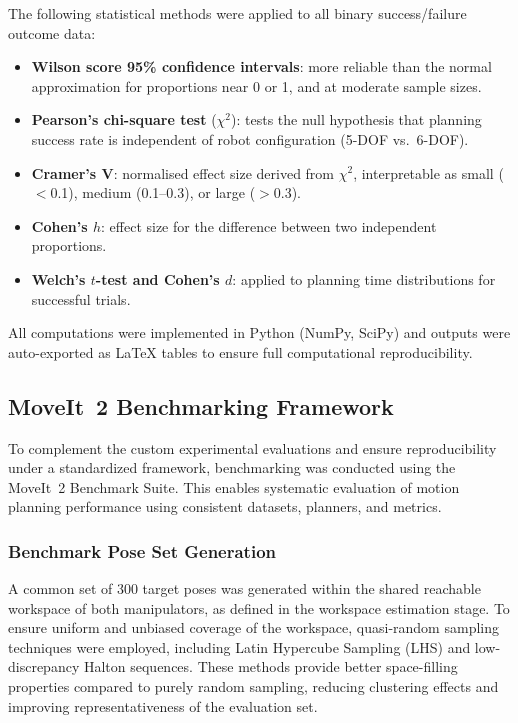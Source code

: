 \documentclass[conference]{IEEEtran}
\begin{document}
	The following statistical methods were applied to all binary
	success/failure outcome data:
	
	\begin{itemize}
		\item \textbf{Wilson score 95\% confidence intervals}: more
		reliable than the normal approximation for proportions near
		0 or 1, and at moderate sample sizes.
		
		\item \textbf{Pearson's chi-square test} ($\chi^2$): tests the
		null hypothesis that planning success rate is independent of
		robot configuration (5-DOF vs.\ 6-DOF).
		
		\item \textbf{Cramer's V}: normalised effect size derived from
		$\chi^2$, interpretable as small ($<$0.1), medium (0.1--0.3),
		or large ($>$0.3).
		
		\item \textbf{Cohen's $h$}: effect size for the difference
		between two independent proportions.
		
		\item \textbf{Welch's $t$-test and Cohen's $d$}: applied to
		planning time distributions for successful trials.
	\end{itemize}
	
	All computations were implemented in Python (NumPy, SciPy) and
	outputs were auto-exported as LaTeX tables to ensure full
	computational reproducibility.
	
	\subsection{MoveIt~2 Benchmarking Framework}
	
	To complement the custom experimental evaluations and ensure reproducibility under a standardized framework, benchmarking was conducted using the MoveIt~2 Benchmark Suite. This enables systematic evaluation of motion planning performance using consistent datasets, planners, and metrics.
	
	
	\subsubsection{Benchmark Pose Set Generation}
	
	A common set of 300 target poses was generated within the shared reachable workspace of both manipulators, as defined in the workspace estimation stage. To ensure uniform and unbiased coverage of the workspace, quasi-random sampling techniques were employed, including Latin Hypercube Sampling (LHS) and low-discrepancy Halton sequences. These methods provide better space-filling properties compared to purely random sampling, reducing clustering effects and improving representativeness of the evaluation set.
	
\end{document}

